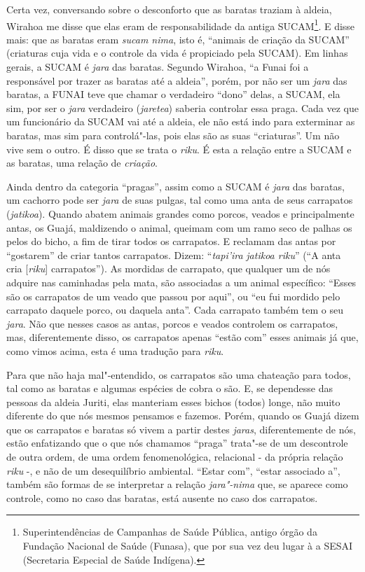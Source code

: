 Certa vez, conversando sobre o desconforto que as baratas traziam à
aldeia, Wirahoa me disse que elas eram de responsabilidade da antiga
SUCAM\footnote{Superintendências de Campanhas de Saúde Pública, antigo
  órgão da Fundação Nacional de Saúde (Funasa), que por sua vez deu
  lugar à a SESAI (Secretaria Especial de Saúde Indígena).}. E disse
mais: que as baratas eram \emph{sucam nima}, isto é, ``animais de
criação da SUCAM'' (criaturas cuja vida e o controle da vida é
propiciado pela SUCAM). Em linhas gerais, a SUCAM é \emph{jara} das
baratas. Segundo Wirahoa, ``a Funai foi a responsável por trazer as
baratas até a aldeia'', porém, por não ser um \emph{jara} das baratas, a
FUNAI teve que chamar o verdadeiro ``dono'' delas, a SUCAM, ela sim, por
ser o \emph{jara} verdadeiro (\emph{jaretea}) saberia controlar essa
praga. Cada vez que um funcionário da SUCAM vai até a aldeia, ele não
está indo para exterminar as baratas, mas sim para controlá"-las, pois
elas são as suas ``criaturas''. Um não vive sem o outro. É disso que se
trata o \emph{riku}. É esta a relação entre a SUCAM e as baratas, uma
relação de \emph{criação}.

Ainda dentro da categoria ``pragas'', assim como a SUCAM é \emph{jara}
das baratas, um cachorro pode ser \emph{jara} de suas pulgas, tal como
uma anta de seus carrapatos (\emph{jatikoa}). Quando abatem animais
grandes como porcos, veados e principalmente antas, os Guajá, maldizendo
o animal, queimam com um ramo seco de palhas os pelos do bicho, a fim de
tirar todos os carrapatos. E reclamam das antas por ``gostarem'' de criar
tantos carrapatos. Dizem: ``\emph{tapi'ira} \emph{jatikoa riku}'' (``A
anta cria {[}\emph{riku}{]} carrapatos''). As mordidas de carrapato, que
qualquer um de nós adquire nas caminhadas pela mata, são associadas a um
animal específico: ``Esses são os carrapatos de um veado que passou por
aqui'', ou ``eu fui mordido pelo carrapato daquele porco, ou daquela
anta''. Cada carrapato também tem o seu \emph{jara}. Não que nesses
casos as antas, porcos e veados controlem os carrapatos, mas,
diferentemente disso, os carrapatos apenas ``estão com'' esses animais já
que, como vimos acima, esta é uma tradução para \emph{riku}.

Para que não haja mal"-entendido, os carrapatos são uma chateação para
todos, tal como as baratas e algumas espécies de cobra o são. E, se
dependesse das pessoas da aldeia Juriti, elas manteriam esses bichos
(todos) longe, não muito diferente do que nós mesmos pensamos e fazemos.
Porém, quando os Guajá dizem que os carrapatos e baratas só vivem a
partir destes \emph{jaras}, diferentemente de nós, estão enfatizando que
o que nós chamamos ``praga'' trata"-se de um descontrole de outra ordem,
de uma ordem fenomenológica, relacional - da própria relação \emph{riku}
-, e não de um desequilíbrio ambiental. ``Estar com'', ``estar associado
a'', também são formas de se interpretar a relação \emph{jara"-nima} que,
se aparece como controle, como no caso das baratas, está ausente no caso
dos carrapatos.

